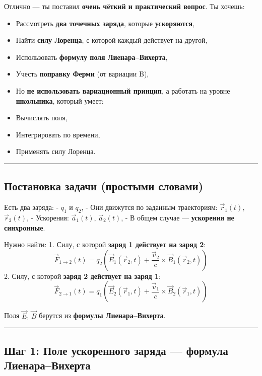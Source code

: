 \documentclass[11pt]{article}
\providecommand{\tightlist}{%
      \setlength{\itemsep}{0pt}\setlength{\parskip}{0pt}}
\begin{document}
Отлично --- ты поставил \textbf{очень чёткий и практический вопрос}. Ты
хочешь:

\begin{itemize}
\tightlist
\item
  Рассмотреть \textbf{два точечных заряда}, которые \textbf{ускоряются},
\item
  Найти \textbf{силу Лоренца}, с которой каждый действует на другой,
\item
  Использовать \textbf{формулу поля Лиенара--Вихерта},
\item
  Учесть \textbf{поправку Ферми} (от вариации B),
\item
  Но \textbf{не использовать вариационный принцип}, а работать на уровне
  \textbf{школьника}, который умеет:
\item
  Вычислять поля,
\item
  Интегрировать по времени,
\item
  Применять силу Лоренца.
\end{itemize}

\begin{center}\rule{0.5\linewidth}{\linethickness}\end{center}

\subsection{Постановка задачи (простыми словами)}

Есть два заряда: - \(q_1\) и \(q_2\), - Они движутся по заданным
траекториям: \(\vec{r}_1(t)\), \(\vec{r}_2(t)\), - Ускорения:
\(\vec{a}_1(t)\), \(\vec{a}_2(t)\), - В общем случае ---
\textbf{ускорения не синхронные}.

Нужно найти: 1. Силу, с которой \textbf{заряд 1 действует на заряд 2}:
\[
   \vec{F}_{1 \to 2}(t) = q_2 \left( \vec{E}_1(\vec{r}_2, t) + \frac{\vec{v}_2}{c} \times \vec{B}_1(\vec{r}_2, t) \right)
   \] 2. Силу, с которой \textbf{заряд 2 действует на заряд 1}: \[
   \vec{F}_{2 \to 1}(t) = q_1 \left( \vec{E}_2(\vec{r}_1, t) + \frac{\vec{v}_1}{c} \times \vec{B}_2(\vec{r}_1, t) \right)
   \]

Поля \(\vec{E}\), \(\vec{B}\) берутся из \textbf{формулы
Лиенара--Вихерта}.

\begin{center}\rule{0.5\linewidth}{\linethickness}\end{center}

\subsection{ Шаг 1: Поле ускоренного заряда --- формула Лиенара--Вихерта}
\end{document}
